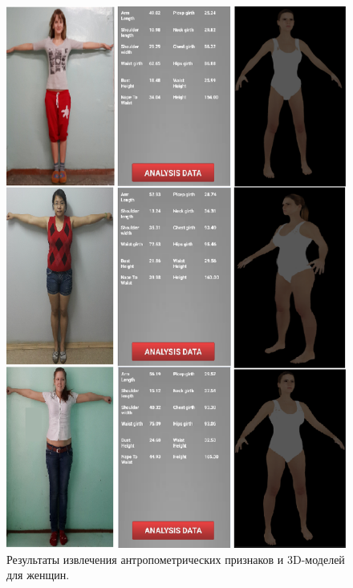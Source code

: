 \begin{figure}[ht!]
\centering
\includegraphics [scale=0.5] {images/h36.png}
\begin{center}
\caption{Результаты извлечения антропометрических признаков и 3D-моделей для женщин.} \label{img36}
\end{center}
\end{figure}
